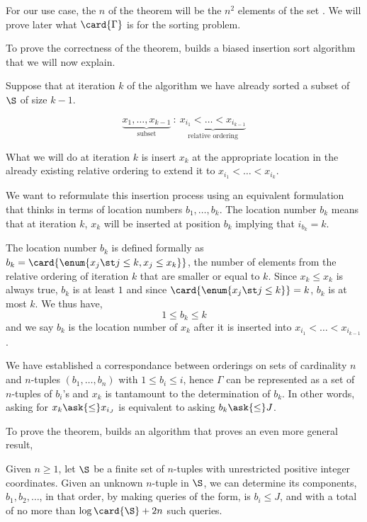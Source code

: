 For our use case, the $n$ of the theorem will be the $n^2$ elements of the set
\XY. We will prove later what $\card{\Gamma}$ is for the sorting \XY problem.

To prove the correctness of the theorem, \citet{fredman:1976} builds a biased
insertion sort algorithm that we will now explain.

Suppose that at iteration \(k\) of the algorithm we have already sorted a
subset of \(\S\) of size \(k-1\).

\begin{displaymath}
\underbrace{x_1, \ldots, x_{k-1}}_{\text{subset}}~:~\underbrace{x_{i_1} <
\ldots < x_{i_{k-1}}}_{\text{relative ordering}}
\end{displaymath}

What we will do at iteration $k$ is insert $x_k$ at the appropriate location
in the already existing relative ordering to extend it to $x_{i_1} < \ldots <
x_{i_k}$.

We want to reformulate this insertion process using an equivalent formulation
that thinks in terms of location numbers $b_1, \ldots, b_k$. The location
number $b_k$ means that at iteration $k$, $x_k$ will be inserted at position
$b_k$ implying that $i_{b_k} = k$.

The location number $b_k$ is defined formally as $b_k = \card{\enum{x_j \st j
\le k, x_j \le x_k}}$, \ie the number of elements from the relative ordering
of iteration $k$ that are smaller or equal to $k$. Since $x_k \le x_k$ is
always true, $b_k$ is at least $1$ and since $\card{\enum{x_j \st j \le k}} =
k$, $b_k$ is at most $k$. We thus have,
$$ 1 \le b_k \le k$$
and we say $b_k$ is the location number of $x_k$ after it is inserted into
$x_{i_1} < \ldots < x_{i_{k-1}}$.

We have established a correspondance between orderings on sets of cardinality
$n$ and $n$-tuples $(b_1, \ldots, b_n)$ with $1 \le b_i \le i$, hence $\Gamma$
can be represented as a set of $n$-tuples of $b_i$'s and $x_k$ is tantamount to
the determination of $b_k$. In other words, asking for $x_k \ask{\le} x_{i_J}$
is equivalent to asking $b_k \ask{\le} J$.

To prove the theorem, \citet{fredman:1976} builds an algorithm that proves an
even more general result,

\begin{lemma}
Given $n \ge 1$, let $\S$ be a finite set of $n$-tuples with unrestricted
positive integer coordinates. Given an unknown $n$-tuple in $\S$, we can
determine its components, $b_1, b_2, \ldots$, in that order, by making queries
of the form, is $b_i \le J$, and with a total of no more than $\log \card{\S}
+ 2n$ such queries.
\end{lemma}

